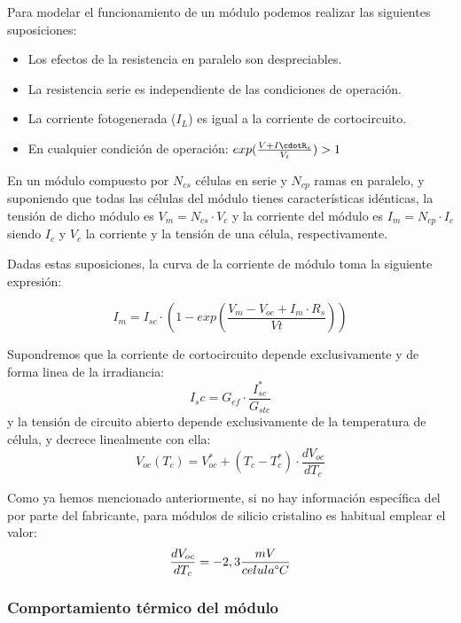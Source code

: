 Para modelar el funcionamiento de un módulo podemos realizar las siguientes suposiciones:
\begin{itemize}
\item Los efectos de la resistencia en paralelo son despreciables.
\item La resistencia serie es independiente de las condiciones de operación.
\item La corriente fotogenerada ($I_L$) es igual a la corriente de cortocircuito.
\item En cualquier condición de operación: $exp(\frac{V+I\cdotR_s}{V_t}) > 1$
\end{itemize}

En un módulo compuesto por $N_{cs}$ células en serie y $N_{cp}$ ramas en paralelo, y suponiendo que todas las células del módulo tienes características idénticas, la tensión de dicho módulo es $V_m= N_{cs} \cdot V_c$ y la corriente del módulo es $I_m = N_{cp} \cdot I_c$ siendo $I_c$ y $V_c$ la corriente y la tensión de  una célula, respectivamente.

Dadas estas suposiciones, la curva de la corriente de módulo toma la siguiente expresión:

\begin{equation}
I_m = I_{sc} \cdot \left( 1 - exp \left(\frac{V_m - V_{oc} + I_m \cdot R_s}{Vt}\right) \right)
\end{equation}

Supondremos que la corriente de cortocircuito depende exclusivamente y de forma linea de la irradiancia:
\begin{equation}
\label{eqn:I_sc}
I_sc = G_{ef} \cdot \frac{I_{sc}^*}{G_{stc}}
\end{equation}
y la tensión de circuito abierto depende exclusivamente de la temperatura de célula, y decrece linealmente con ella:
\begin{equation}
\label{eqn:V_oc}
V_{oc}(T_c) = V_{oc}^* + (T_c - T_c^*) \cdot \frac{dV_{oc}}{dT_c}
\end{equation}

Como ya hemos mencionado anteriormente, si no hay información específica del por parte del fabricante, para módulos de silicio cristalino es habitual emplear el valor:
\begin{equation}
\frac{dV_{oc}}{dT_c}=-2,3\frac{mV}{ celula \degree C}
\end{equation}

\subsubsection{Comportamiento térmico del módulo}
\label{section:term_behaviour}

